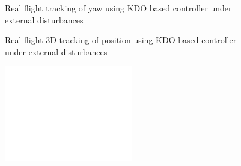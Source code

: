\documentclass[letterpaper%
, twoside%
, 12pt%
,memoire%
, english%
,creativecommons,hyperref%
]{thETS}
\theoremstyle{newThmStyle}
\begin{document}
\begin{figure}[H]
	\centering
	\parbox{0.75\textwidth}{\caption{Real flight tracking of yaw using KDO based controller under external disturbances\label{Fig:yawtracKDODist}}}
\end{figure}
\begin{figure}[H]
	\centering
	\parbox{0.75\textwidth}{\caption{Real flight 3D tracking of position using KDO based controller under external disturbances\label{Fig:3dKDODist}}}
\end{figure}
\begin{figure}[H]
	\includegraphics[width=0.5\textwidth]{Figures/blank.png}
\end{figure}
\FloatBarrier
\end{document}

